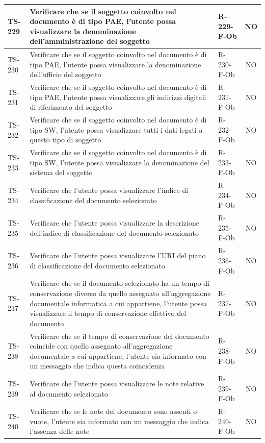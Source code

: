 \documentclass[a4paper,12pt]{article}
\begin{document}
\begin{longtable}{|p{1.5cm}|p{8.3cm}|p{2.4cm}|c|}
\hline
TS-229 & Verificare che se il soggetto coinvolto nel documento è di tipo PAE, l'utente possa visualizzare la denominazione dell'amministrazione del soggetto & R-229-F-Ob & NO \\
\hline
TS-230 & Verificare che se il soggetto coinvolto nel documento è di tipo PAE, l'utente possa visualizzare la denominazione dell'ufficio del soggetto & R-230-F-Ob & NO \\
\hline
TS-231 & Verificare che se il soggetto coinvolto nel documento è di tipo PAE, l'utente possa visualizzare gli indirizzi digitali di riferimento del soggetto & R-231-F-Ob & NO \\
\hline
TS-232 & Verificare che se il soggetto coinvolto nel documento è di tipo SW, l'utente possa visualizzare tutti i dati legati a questo tipo di soggetto & R-232-F-Ob & NO \\
\hline
TS-233 & Verificare che se il soggetto coinvolto nel documento è di tipo SW, l'utente possa visualizzare la denominazione del sistema del soggetto & R-233-F-Ob & NO \\
\hline
TS-234 & Verificare che l'utente possa visualizzare l'indice di classificazione del documento selezionato & R-234-F-Ob & NO \\
\hline
TS-235 & Verificare che l'utente possa visualizzare la descrizione dell'indice di classificazione del documento selezionato & R-235-F-Ob & NO \\
\hline
TS-236 & Verificare che l'utente possa visualizzare l'URI del piano di classificazione del documento selezionato & R-236-F-Ob & NO \\
\hline
TS-237 & Verificare che se il documento selezionato ha un tempo di conservazione diverso da quello assegnato all'aggregazione documentale informatica a cui appartiene, l'utente possa visualizzare il tempo di conservazione effettivo del documento & R-237-F-Ob  & NO \\
\hline
TS-238 & Verificare che se il tempo di conservazione del documento coincide con quello assegnato all'aggregazione documentale a cui appartiene, l'utente sia informato con un messaggio che indica questa coincidenza & R-238-F-Ob & NO \\
\hline
TS-239 & Verificare che l'utente possa visualizzare le note relative al documento selezionato & R-239-F-Ob & NO \\
\hline
TS-240 & Verificare che se le note del documento sono assenti o vuote, l'utente sia informato con un messaggio che indica l'assenza delle note & R-240-F-Ob & NO \\

\end{longtable}
\end{document}

